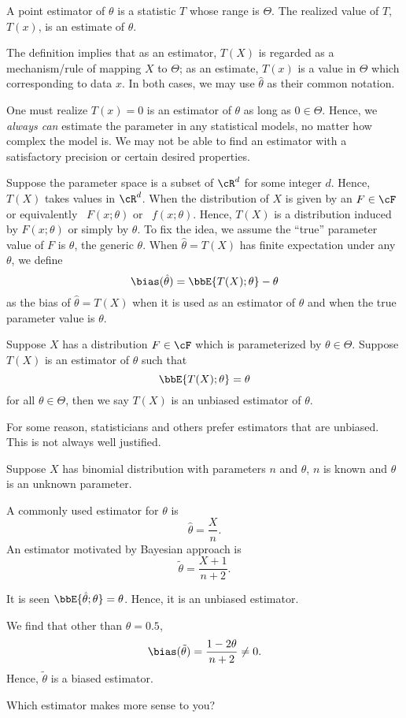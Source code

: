 \begin{defi}
A point estimator of $\theta$ is a statistic $T$ whose range is $\Theta$. 
The realized value of $T$, $T(x)$, is an estimate of $\theta$.
\end{defi}

The definition implies that as an estimator, $T(X)$ is regarded as a
mechanism/rule of mapping $X$ to $\Theta$; as an estimate, $T(x)$
is a value in $\Theta$ which corresponding to data $x$.
In both cases, we may use $\hat \theta$ as their common notation.

One must realize $T(x) = 0$ is an estimator of $\theta$ as long
as $0 \in \Theta$. Hence, we {\it always can} estimate the parameter
in any statistical models, no matter how complex the model is.
We may not be able to find an estimator with a satisfactory precision
or certain desired properties.

Suppose the parameter space is a subset of $\cR^d$ for
some integer $d$. Hence, $T(X)$ takes values in $\cR^d$.
When the distribution of $X$ is given by an $F \in \cF$ or 
equivalently \cdf\ $F(x; \theta)$ or \pdf\ $f(x; \theta)$.
Hence, $T(X)$ is a distribution induced by $F(x; \theta)$
or simply by $\theta$. To fix the idea, we assume
the ``true'' parameter value of $F$ is $\theta$, the generic $\theta$.
When $\hat \theta = T(X)$ has finite expectation under any $\theta$, 
we define
\[
\bias(\hat \theta) = \bbE \{ T(X); \theta\} - \theta
\]
as the bias of $\hat \theta = T(X)$ when it is used as an estimator of $\theta$ and
when the true parameter value is $\theta$.

\begin{defi}
Suppose $X$ has a distribution $F \in \cF$ which is parameterized
by $\theta \in \Theta$.
Suppose $T(X)$ is an estimator of $\theta$ such that
\[
\bbE \{T(X); \theta\} = \theta
\]
for all $\theta \in \Theta$, then we say $T(X)$ is an unbiased
estimator of $\theta$.
\end{defi}

For some reason, statisticians and others prefer estimators that
are unbiased. This is not always well justified.

\begin{example}
Suppose $X$ has binomial distribution with parameters $n$ and $\theta$,
$n$ is known and $\theta$ is an unknown parameter. 

A commonly used estimator for $\theta$ is
\[
\hat \theta = \frac{X}{n}.
\]
An estimator motivated by Bayesian approach is
\[
\tilde \theta = \frac{X+1}{n+2}.
\]

It is seen $\bbE\{\hat \theta; \theta\} = \theta$. Hence, it is an unbiased
estimator.

We find that other than $\theta = 0.5$, 
\[
\bias (\tilde \theta) = \frac{1-2\theta}{n+2} \neq 0.
\]
Hence, $\tilde \theta$ is a biased estimator.

Which estimator makes more sense to you?
\end{example}

